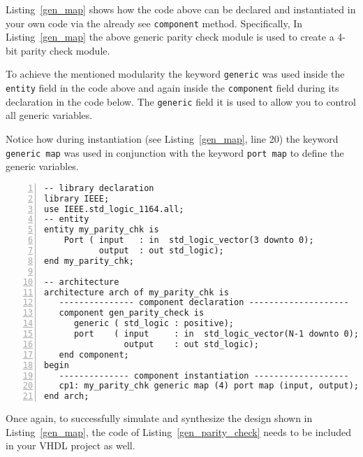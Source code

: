 Listing~\ref{gen_map} shows how the code above can be declared and instantiated in your own code via the already see \texttt{component} method. Specifically, In Listing~\ref{gen_map} the above generic parity check module is used to create a 4-bit parity check module.

To achieve the mentioned modularity the keyword \texttt{generic} was used inside the \texttt{entity} field in the code above and again inside the \texttt{component} field during its declaration in the code below. The \texttt{generic} field it is used to allow you to control all generic variables.

Notice how during instantiation (see Listing~\ref{gen_map}, line 20) the keyword \texttt{generic map} was used in conjunction with the keyword \texttt{port map} to define the generic variables.

\noindent
\begin{minipage}{0.99\linewidth}
\begin{lstlisting}[numbers=left, label=gen_map, caption=Use of \texttt{generic} for the construct of a generic parity check code.]
-- library declaration
library IEEE;
use IEEE.std_logic_1164.all;
-- entity
entity my_parity_chk is
    Port ( input   : in  std_logic_vector(3 downto 0);
           output  : out std_logic);
end my_parity_chk;

-- architecture
architecture arch of my_parity_chk is
   --------------- component declaration --------------------
   component gen_parity_check is
      generic ( std_logic : positive);
      port    ( input     : in  std_logic_vector(N-1 downto 0);
                output    : out std_logic);
   end component;
begin
   -------------- component instantiation -------------------
   cp1: my_parity_chk generic map (4) port map (input, output);
end arch;

\end{lstlisting}
\end{minipage}

Once again, to successfully simulate and synthesize the design shown in Listing~\ref{gen_map}, the code of Listing~\ref{gen_parity_check} needs to be included in your VHDL project as well.

